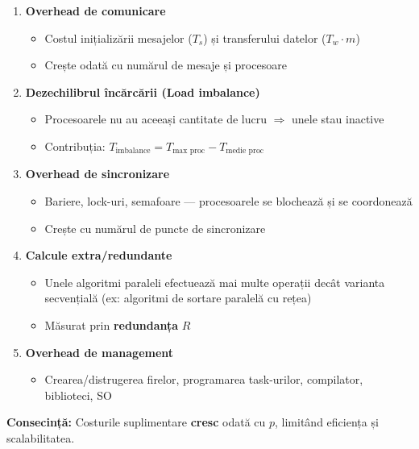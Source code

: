 \documentclass[a4paper,11pt]{article}
\begin{document}
\begin{enumerate}
  \item \textbf{Overhead de comunicare}
  \begin{itemize}[noitemsep]
    \item Costul inițializării mesajelor ($T_s$) și transferului datelor ($T_w \cdot m$)
    \item Crește odată cu numărul de mesaje și procesoare
  \end{itemize}

  \item \textbf{Dezechilibrul încărcării (Load imbalance)}
  \begin{itemize}[noitemsep]
    \item Procesoarele nu au aceeași cantitate de lucru $\Rightarrow$ unele stau inactive
    \item Contribuția: $T_{\text{imbalance}} = T_{\text{max proc}} - T_{\text{medie proc}}$
  \end{itemize}

  \item \textbf{Overhead de sincronizare}
  \begin{itemize}[noitemsep]
    \item Bariere, lock-uri, semafoare — procesoarele se blochează și se coordonează
    \item Crește cu numărul de puncte de sincronizare
  \end{itemize}

  \item \textbf{Calcule extra/redundante}
  \begin{itemize}[noitemsep]
    \item Unele algoritmi paraleli efectuează mai multe operații decât varianta secvențială (ex: algoritmi de sortare paralelă cu rețea)
    \item Măsurat prin \textbf{redundanța} $R$
  \end{itemize}

  \item \textbf{Overhead de management}
  \begin{itemize}[noitemsep]
    \item Crearea/distrugerea firelor, programarea task-urilor, compilator, biblioteci, SO
  \end{itemize}
\end{enumerate}

\textbf{Consecință:} Costurile suplimentare \textbf{cresc} odată cu $p$, limitând eficiența și scalabilitatea.
\end{document}
